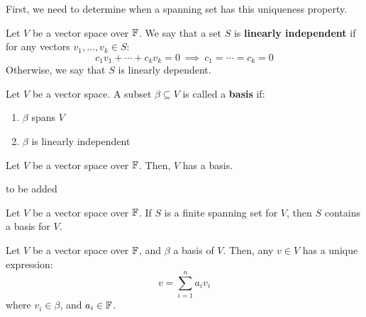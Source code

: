 \documentclass{article}
\begin{document}
First, we need to determine when a spanning set has this uniqueness property.

\begin{defn}
Let $ V $ be a vector space over $ \mathbb{F} $. We say that a set $ S $ is \textbf{linearly independent} if for any vectors $ v_{1}, \dots , v_{k} \in S $:
\begin{equation*}
    c_{1}v_{1} + \cdots + c_{k}v_{k} = 0 \ \implies \ c_{1} = \cdots = c_{k} = 0
\end{equation*}
Otherwise, we say that $ S $ is linearly dependent.
\end{defn}

\begin{defn}
Let $ V $ be a vector space. A subset $ \beta \subseteq V $ is called a \textbf{basis} if:
\begin{enumerate}
    \item $ \beta $ spans $ V $
    \item $ \beta $ is linearly independent
\end{enumerate}
\end{defn}

\newpage
\begin{thm}
Let $ V $ be a vector space over $ \mathbb{F} $. Then, $ V $ has a basis.
\end{thm}

\begin{pf}
to be added
\end{pf}

\begin{crll}
Let $ V $ be a vector space over $ \mathbb{F} $. If $ S $ is a finite spanning set for $ V $, then $ S $ contains a basis for $ V $.
\end{crll}

\newpage
\begin{thm}
Let $ V $ be a vector space over $ \mathbb{F} $, and $ \beta $  a basis of $ V $. Then, any $ v \in V $ has a unique expression:
\begin{equation*}
    v = \sum_{i=1}^{n} {a_{i}v_{i}} 
\end{equation*}
where $ v_{i} \in \beta $, and $ a_{i} \in \mathbb{F} $.
\end{thm}
\end{document}
